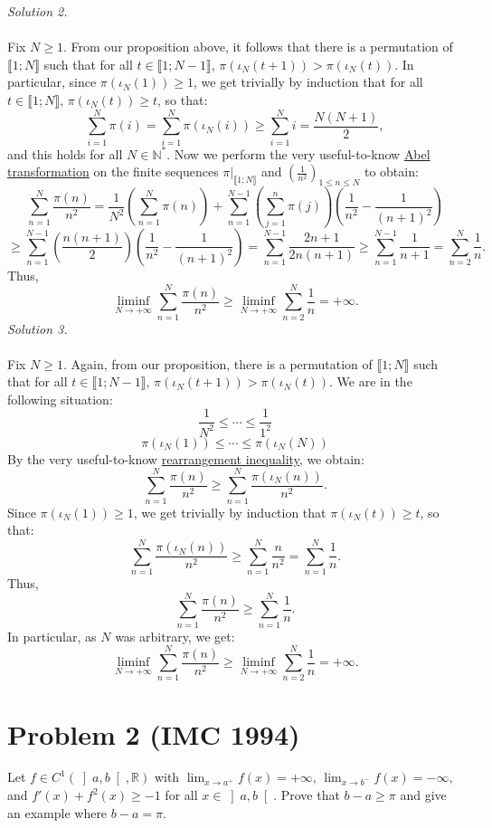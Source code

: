 \documentclass[11pt, a4paper, oneside]{article}
\newcommand{\problem}[1][]{\section{#1} \hfill \par}
\theoremstyle{remark}
\theoremstyle{lemma}
\begin{document}
\textit{Solution 2.}
\\\\
Fix \(N \geq 1\). From our proposition above, it follows that there is a permutation of \(\llbracket 1;N \rrbracket\) such that for all \(t \in \llbracket 1;N-1 \rrbracket\), \(\pi\left(\iota_N(t+1)\right) > \pi\left(\iota_N(t)\right)\). In particular, since \(\pi\left(\iota_N(1)\right) \geq 1\), we get trivially by induction that for all \(t \in \llbracket 1;N \rrbracket\), \(\pi\left(\iota_N(t)\right) \geq t\), so that:
\[
\sum_{i=1}^{N} \pi(i) = \sum_{i=1}^{N} \pi\left(\iota_N(i)\right) \geq \sum_{i=1}^{N} i = \frac{N(N+1)}{2},
\]
and this holds for all \(N \in \mathbb{N}^{*}\). Now we perform the very useful-to-know \href{https://en.wikipedia.org/wiki/Summation_by_parts}{Abel transformation} on the finite sequences \(\pi|_{\llbracket 1; N \rrbracket}\) and \(\left(\frac{1}{n^2}\right)_{1 \leq n \leq N}\) to obtain:
\[
\sum_{n=1}^{N} \frac{\pi(n)}{n^2} = \frac{1}{N^2} \left(\sum_{n=1}^{N} \pi(n)\right) + \sum_{n=1}^{N-1} \left(\sum_{j=1}^{n} \pi(j)\right) \left( \frac{1}{n^2} - \frac{1}{(n+1)^2} \right)
\]
\[
\geq \sum_{n=1}^{N-1} \left( \frac{n(n+1)}{2} \right) \left( \frac{1}{n^2} - \frac{1}{(n+1)^2} \right) = \sum_{n=1}^{N-1} \frac{2n+1}{2n(n+1)} \geq \sum_{n=1}^{N-1} \frac{1}{n+1} = \sum_{n=2}^{N} \frac{1}{n}.
\]
Thus,
\[
\liminf_{N \to +\infty} \sum_{n=1}^{N} \frac{\pi(n)}{n^2} \geq \liminf_{N \to +\infty} \sum_{n=2}^{N} \frac{1}{n} = +\infty.
\]
\textit{Solution 3.}
\\\\
Fix \(N \geq 1\). Again, from our proposition, there is a permutation of \(\llbracket 1;N \rrbracket\) such that for all \(t \in \llbracket 1;N-1 \rrbracket\), \(\pi\left(\iota_N(t+1)\right) > \pi\left(\iota_N(t)\right)\). We are in the following situation:
\[
\frac{1}{N^2} \leq \cdots \leq \frac{1}{1^2}
\]
\[
\pi\left(\iota_N(1)\right) \leq \cdots \leq \pi\left(\iota_N(N)\right)
\]
By the very useful-to-know \href{https://en.wikipedia.org/wiki/Rearrangement_inequality}{rearrangement inequality}, we obtain:
\[
\sum_{n=1}^{N} \frac{\pi(n)}{n^2} \geq \sum_{n=1}^{N} \frac{\pi\left(\iota_N(n)\right)}{n^2}.
\]
Since \(\pi\left(\iota_N(1)\right) \geq 1\), we get trivially by induction that \(\pi\left(\iota_N(t)\right) \geq t\), so that:
\[
\sum_{n=1}^{N} \frac{\pi\left(\iota_N(n)\right)}{n^2} \geq \sum_{n=1}^{N} \frac{n}{n^2} = \sum_{n=1}^{N} \frac{1}{n}.
\]
Thus,
\[
\sum_{n=1}^{N} \frac{\pi(n)}{n^2} \geq \sum_{n=1}^{N} \frac{1}{n}.
\]
In particular, as \(N\) was arbitrary, we get:
\[
\liminf_{N \to +\infty} \sum_{n=1}^{N} \frac{\pi(n)}{n^2} \geq \liminf_{N \to +\infty} \sum_{n=2}^{N} \frac{1}{n} = +\infty.
\]
\newpage
\problem[Problem 2 (IMC 1994)]
Let \( f \in C^1\left( \left]a, b\right[, \mathbb{R} \right) \) with \( \lim_{x \to a^+} f(x) = +\infty \), \( \lim_{x \to b^-} f(x) = -\infty \), and  
\( f'(x) + f^2(x) \geq -1 \) for all \( x \in \left]a, b\right[ \). Prove that \( b - a \geq \pi \) and give an example where \( b - a = \pi \).
\end{document}
